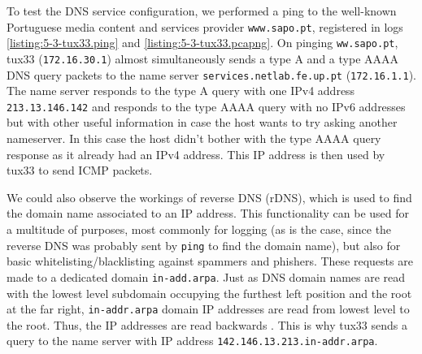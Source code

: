 \documentclass[a4paper, 11pt]{report}
\begin{document}
To test the DNS service configuration, we performed a ping to the well-known Portuguese media content and services provider \texttt{www.sapo.pt}, registered in logs \ref{listing:5-3-tux33.ping} and \ref{listing:5-3-tux33.pcapng}.
On pinging \texttt{ww.sapo.pt}, tux33 (\texttt{172.16.30.1}) almost simultaneously sends a type A and a type AAAA DNS query packets to the name server \texttt{services.netlab.fe.up.pt} (\texttt{172.16.1.1}).
The name server responds to the type A query with one IPv4 address \texttt{213.13.146.142} and responds to the type AAAA query with no IPv6 addresses but with other useful information in case the host wants to try asking another nameserver.
In this case the host didn't bother with the type AAAA query response as it already had an IPv4 address.
This IP address is then used by tux33 to send ICMP packets.

We could also observe the workings of reverse DNS (rDNS), which is used to find the domain name associated to an IP address.
This functionality can be used for a multitude of purposes, most commonly for logging (as is the case, since the reverse DNS was probably sent by \texttt{ping} to find the domain name), but also for basic whitelisting/blacklisting against spammers and phishers.
These requests are made to a dedicated domain \texttt{in-add.arpa}.
Just as DNS domain names are read with the lowest level subdomain occupying the furthest left position and the root at the far right, \texttt{in-addr.arpa} domain IP addresses are read from lowest level to the root. Thus, the IP addresses are read backwards \cite{in-addr-arpa}.
This is why tux33 sends a query to the name server with IP address \texttt{142.146.13.213.in-addr.arpa}.




\end{document}
